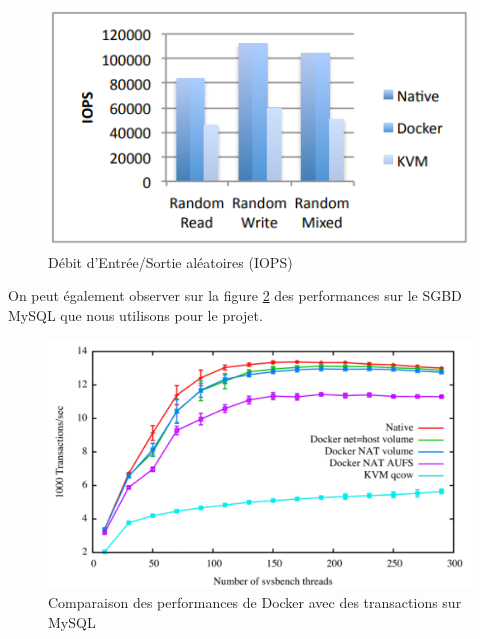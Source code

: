 \documentclass[
    iai, %
    il, %
]{heig-tb}
\begin{document}
\begin{center}
    \begin{figure}
        \includegraphics[width=\textwidth]{./assets/figures/docker-perf-random-io.png}
        \caption[Débit d'I/O aléatoires]{Débit d'Entrée/Sortie aléatoires (IOPS) \cite{rad2017introduction} \label{random-io}}
    \end{figure}
\end{center}

On peut également observer sur la figure \ref{docker-perf-mysql} des performances sur le SGBD MySQL
que nous utilisons pour le projet.

\begin{center}
    \begin{figure}
        \includegraphics[width=\textwidth]{./assets/figures/docker-perf-mysql.png}
        \caption[Comparaison des perf. Docker sur MySQ]{Comparaison des performances de Docker avec des transactions sur MySQL \cite{felter} \label{docker-perf-mysql}}
    \end{figure}
\end{center}
\end{document}
